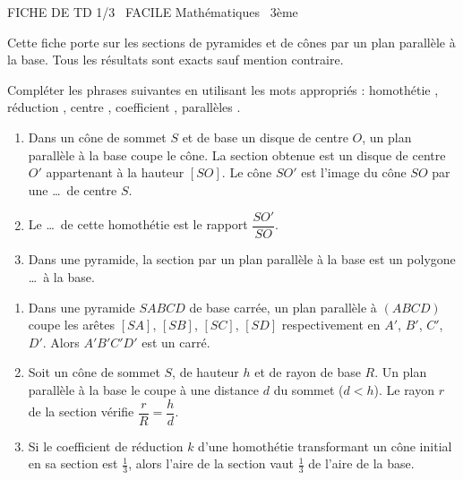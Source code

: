 \documentclass[11pt]{article}
\begin{document}
\begin{tcolorbox}[enhanced,colback=popink,colframe=popink,arc=10pt,boxrule=0pt,left=12pt,right=12pt,top=9pt,bottom=9pt]
{\color{white}\popxbold\small FICHE DE TD 1/3 \textbullet\ FACILE \hfill Mathématiques \textbullet\ 3ème\par}
\end{tcolorbox}
\vspace{4pt}
\noindent Cette fiche porte sur les sections de pyramides et de cônes par un plan parallèle à la base. Tous les résultats sont exacts sauf mention contraire.

\begin{exercice}
Compléter les phrases suivantes en utilisant les mots appropriés : \og homothétie \fg, \og réduction \fg, \og centre \fg, \og coefficient \fg, \og parallèles \fg.
\begin{enumerate}
    \item Dans un cône de sommet $S$ et de base un disque de centre $O$, un plan parallèle à la base coupe le cône. La section obtenue est un disque de centre $O'$ appartenant à la hauteur $[SO]$. Le cône $SO'$ est l'image du cône $SO$ par une \dots\ de centre $S$.
    \item Le \dots\ de cette homothétie est le rapport $\dfrac{SO'}{SO}$.
    \item Dans une pyramide, la section par un plan parallèle à la base est un polygone \dots\ à la base.
\end{enumerate}
\end{exercice}

\begin{exercice}
\begin{enumerate}
    \item Dans une pyramide $SABCD$ de base carrée, un plan parallèle à $(ABCD)$ coupe les arêtes $[SA]$, $[SB]$, $[SC]$, $[SD]$ respectivement en $A'$, $B'$, $C'$, $D'$. Alors $A'B'C'D'$ est un carré.
    \item Soit un cône de sommet $S$, de hauteur $h$ et de rayon de base $R$. Un plan parallèle à la base le coupe à une distance $d$ du sommet ($d<h$). Le rayon $r$ de la section vérifie $\dfrac{r}{R} = \dfrac{h}{d}$.
    \item Si le coefficient de réduction $k$ d'une homothétie transformant un cône initial en sa section est $\frac{1}{3}$, alors l'aire de la section vaut $\frac{1}{3}$ de l'aire de la base.
\end{enumerate}
\end{exercice}
\end{document}
